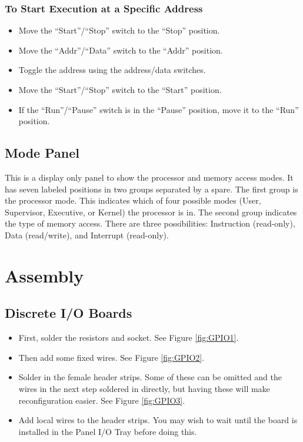 \documentclass[10pt, openany]{book}
\newcommand{\switch}[2]{``#1''/``#2''}
\newcommand{\position}[1]{``#1''}
\begin{document}
\subsubsection{To Start Execution at a Specific Address}
\begin{itemize}
  \item Move the \switch{Start}{Stop} switch to the \position{Stop} position.
  \item Move the \switch{Addr}{Data} switch to the \position{Addr} position.
  \item Toggle the address using the address/data switches.
  \item Move the \switch{Start}{Stop} switch to the \position{Start} position.
  \item If the \switch{Run}{Pause} switch is in the \position{Pause} position, move it to the \position{Run} position.
\end{itemize}

\subsection{Mode Panel}
This is a display only panel to show the processor and memory access modes.  It has seven labeled positions in two groups separated by a spare.  The first group is the processor mode.  This indicates which of four possible modes (User, Supervisor, Executive, or Kernel) the processor is in.  The second group indicates the type of memory access.  There are three possibilities: Instruction (read-only), Data (read/write), and Interrupt (read-only).

\section{Assembly}

\subsection{Discrete I/O Boards}
\begin{itemize}
  \item First, solder the resistors and socket.  See Figure \ref{fig:GPIO1}.
  \item Then add some fixed wires.  See Figure \ref{fig:GPIO2}.
  \item Solder in the female header strips.  Some of these can be omitted and the wires in the next step soldered in directly, but having these will make reconfiguration easier.  See Figure \ref{fig:GPIO3}.
  \item Add local wires to the header strips.  You may wish to wait until the board is installed in the Panel I/O Tray before doing this.
\end{itemize}
\end{document}
